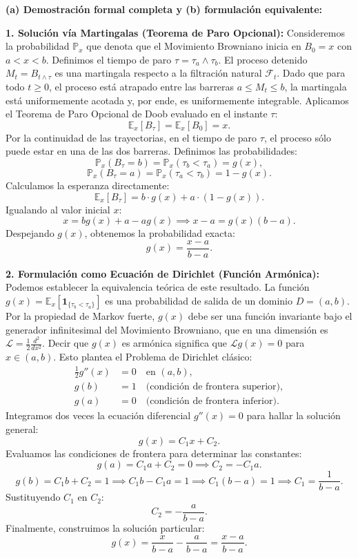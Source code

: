 \documentclass[11pt, letterpaper]{article}
\begin{document}
\begin{solucion}
    \vspace{3mm}
    \textbf{(a) Demostración formal completa y (b) formulación equivalente:}

    \textbf{1. Solución vía Martingalas (Teorema de Paro Opcional):}
    Consideremos la probabilidad $\mathbb{P}_x$ que denota que el Movimiento Browniano inicia en $B_0 = x$ con $a < x < b$.
    Definimos el tiempo de paro $\tau = \tau_a \wedge \tau_b$. 
    El proceso detenido $M_t = B_{t \wedge \tau}$ es una martingala respecto a la filtración natural $\mathcal{F}_t$.
    Dado que para todo $t \ge 0$, el proceso está atrapado entre las barreras $a \le M_t \le b$, la martingala está uniformemente acotada y, por ende, es uniformemente integrable.
    Aplicamos el Teorema de Paro Opcional de Doob evaluado en el instante $\tau$:
    $$ \mathbb{E}_x[B_\tau] = \mathbb{E}_x[B_0] = x. $$
    Por la continuidad de las trayectorias, en el tiempo de paro $\tau$, el proceso sólo puede estar en una de las dos barreras. Definimos las probabilidades:
    $$ \mathbb{P}_x(B_\tau = b) = \mathbb{P}_x(\tau_b < \tau_a) = g(x), $$
    $$ \mathbb{P}_x(B_\tau = a) = \mathbb{P}_x(\tau_a < \tau_b) = 1 - g(x). $$
    Calculamos la esperanza directamente:
    $$ \mathbb{E}_x[B_\tau] = b \cdot g(x) + a \cdot (1 - g(x)). $$
    Igualando al valor inicial $x$:
    $$ x = b g(x) + a - a g(x) \implies x - a = g(x)(b - a). $$
    Despejando $g(x)$, obtenemos la probabilidad exacta:
    $$ g(x) = \frac{x - a}{b - a}. $$

    \textbf{2. Formulación como Ecuación de Dirichlet (Función Armónica):}
    Podemos establecer la equivalencia teórica de este resultado. La función $g(x) = \mathbb{E}_x[\mathbf{1}_{\{\tau_b < \tau_a\}}]$ es una probabilidad de salida de un dominio $D = (a, b)$. 
    Por la propiedad de Markov fuerte, $g(x)$ debe ser una función invariante bajo el generador infinitesimal del Movimiento Browniano, que en una dimensión es $\mathcal{L} = \frac{1}{2}\frac{d^2}{dx^2}$.
    Decir que $g(x)$ es armónica significa que $\mathcal{L}g(x) = 0$ para $x \in (a, b)$.
    Esto plantea el Problema de Dirichlet clásico:
    \begin{align*}
        \frac{1}{2}g''(x) &= 0 \quad \text{en } (a, b), \\
        g(b) &= 1 \quad \text{(condición de frontera superior)}, \\
        g(a) &= 0 \quad \text{(condición de frontera inferior)}.
    \end{align*}
    Integramos dos veces la ecuación diferencial $g''(x) = 0$ para hallar la solución general:
    $$ g(x) = C_1 x + C_2. $$
    Evaluamos las condiciones de frontera para determinar las constantes:
    $$ g(a) = C_1 a + C_2 = 0 \implies C_2 = -C_1 a. $$
    $$ g(b) = C_1 b + C_2 = 1 \implies C_1 b - C_1 a = 1 \implies C_1(b - a) = 1 \implies C_1 = \frac{1}{b - a}. $$
    Sustituyendo $C_1$ en $C_2$:
    $$ C_2 = -\frac{a}{b - a}. $$
    Finalmente, construimos la solución particular:
    $$ g(x) = \frac{x}{b - a} - \frac{a}{b - a} = \frac{x - a}{b - a}. $$
    

\end{solucion}
\end{document}
